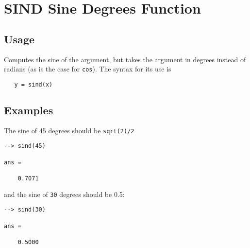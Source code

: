 \section{SIND Sine Degrees Function}

\subsection{Usage}

Computes the sine of the argument, but takes
the argument in degrees instead of radians (as is the case
for \verb|cos|). The syntax for its use is
\begin{verbatim}
   y = sind(x)
\end{verbatim}
\subsection{Examples}

The sine of 45 degrees should be \verb|sqrt(2)/2|
\begin{verbatim}
--> sind(45)

ans = 

    0.7071 
\end{verbatim}
and the sine of \verb|30| degrees should be 0.5:
\begin{verbatim}
--> sind(30)

ans = 

    0.5000 
\end{verbatim}
